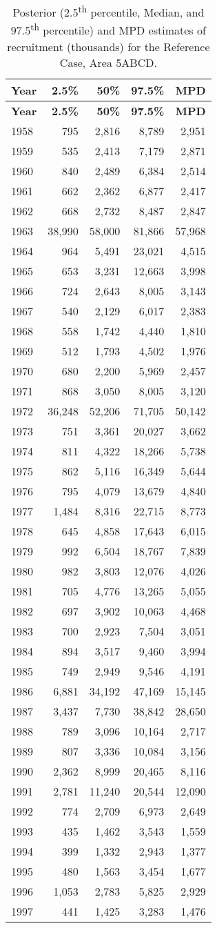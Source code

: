 \documentclass[11pt]{book}
\begin{document}
\begin{longtable}[]{@{}lrrrr@{}}
\caption{\label{tab:tab-post-recr-5abcd}Posterior (2.5\textsuperscript{th} percentile, Median, and 97.5\textsuperscript{th} percentile) and MPD estimates of recruitment (thousands) for the Reference Case, Area 5ABCD.}\tabularnewline
\toprule
\textbf{Year} & \textbf{2.5\%} & \textbf{50\%} & \textbf{97.5\%} & \textbf{MPD}\tabularnewline
\midrule
\endfirsthead
\toprule
\textbf{Year} & \textbf{2.5\%} & \textbf{50\%} & \textbf{97.5\%} & \textbf{MPD}\tabularnewline
\midrule
\endhead
1958 & 795 & 2,816 & 8,789 & 2,951\tabularnewline
1959 & 535 & 2,413 & 7,179 & 2,871\tabularnewline
1960 & 840 & 2,489 & 6,384 & 2,514\tabularnewline
1961 & 662 & 2,362 & 6,877 & 2,417\tabularnewline
1962 & 668 & 2,732 & 8,487 & 2,847\tabularnewline
1963 & 38,990 & 58,000 & 81,866 & 57,968\tabularnewline
1964 & 964 & 5,491 & 23,021 & 4,515\tabularnewline
1965 & 653 & 3,231 & 12,663 & 3,998\tabularnewline
1966 & 724 & 2,643 & 8,005 & 3,143\tabularnewline
1967 & 540 & 2,129 & 6,017 & 2,383\tabularnewline
1968 & 558 & 1,742 & 4,440 & 1,810\tabularnewline
1969 & 512 & 1,793 & 4,502 & 1,976\tabularnewline
1970 & 680 & 2,200 & 5,969 & 2,457\tabularnewline
1971 & 868 & 3,050 & 8,005 & 3,120\tabularnewline
1972 & 36,248 & 52,206 & 71,705 & 50,142\tabularnewline
1973 & 751 & 3,361 & 20,027 & 3,662\tabularnewline
1974 & 811 & 4,322 & 18,266 & 5,738\tabularnewline
1975 & 862 & 5,116 & 16,349 & 5,644\tabularnewline
1976 & 795 & 4,079 & 13,679 & 4,840\tabularnewline
1977 & 1,484 & 8,316 & 22,715 & 8,773\tabularnewline
1978 & 645 & 4,858 & 17,643 & 6,015\tabularnewline
1979 & 992 & 6,504 & 18,767 & 7,839\tabularnewline
1980 & 982 & 3,803 & 12,076 & 4,026\tabularnewline
1981 & 705 & 4,776 & 13,265 & 5,055\tabularnewline
1982 & 697 & 3,902 & 10,063 & 4,468\tabularnewline
1983 & 700 & 2,923 & 7,504 & 3,051\tabularnewline
1984 & 894 & 3,517 & 9,460 & 3,994\tabularnewline
1985 & 749 & 2,949 & 9,546 & 4,191\tabularnewline
1986 & 6,881 & 34,192 & 47,169 & 15,145\tabularnewline
1987 & 3,437 & 7,730 & 38,842 & 28,650\tabularnewline
1988 & 789 & 3,096 & 10,164 & 2,717\tabularnewline
1989 & 807 & 3,336 & 10,084 & 3,156\tabularnewline
1990 & 2,362 & 8,999 & 20,465 & 8,116\tabularnewline
1991 & 2,781 & 11,240 & 20,544 & 12,090\tabularnewline
1992 & 774 & 2,709 & 6,973 & 2,649\tabularnewline
1993 & 435 & 1,462 & 3,543 & 1,559\tabularnewline
1994 & 399 & 1,332 & 2,943 & 1,377\tabularnewline
1995 & 480 & 1,563 & 3,454 & 1,677\tabularnewline
1996 & 1,053 & 2,783 & 5,825 & 2,929\tabularnewline
1997 & 441 & 1,425 & 3,283 & 1,476\tabularnewline

\end{longtable}
\end{document}
